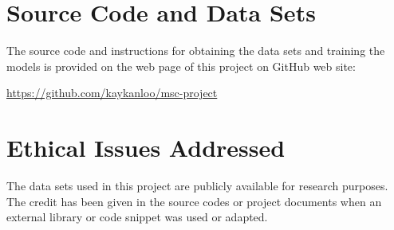 \begin{appendices}
\chapter{Source Code and Data Sets} \label{sec:instructions}

The source code and instructions for obtaining the data sets and training the models is provided on the web page of this project on GitHub web site:

\url{https://github.com/kaykanloo/msc-project}


\chapter{Ethical Issues Addressed}

The data sets used in this project are publicly available for research purposes. The credit has been given in the source codes or project documents when an external library or code snippet was used or adapted. 

\end{appendices}